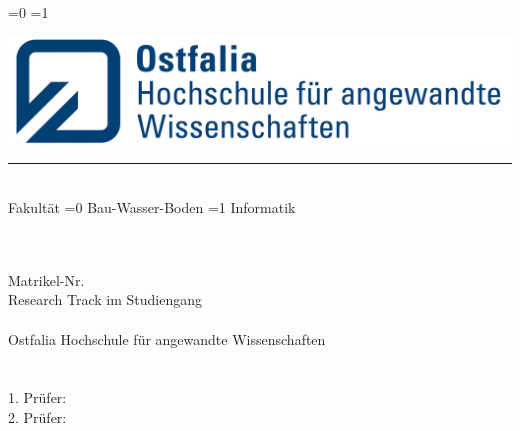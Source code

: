 
\begin{titlepage}
    
    \ifnum\value{documentfakultaet}=0
    \fi\ifnum\value{documentfakultaet}=1
    \fi
    
    \begin{flushleft}
    \includegraphics[scale=0.9]{Bilder/ostfalia_logo2.png}\\
    \color{strich} 
    \hspace{24mm}\rule{70mm}{0.25mm}\\
    \hspace{24mm}\Large
    \textsf{Fakultät
        \ifnum\value{documentfakultaet}=0
	    	Bau-Wasser-Boden
	    \fi\ifnum\value{documentfakultaet}=1
	    	Informatik
	    \fi
	}
    \end{flushleft}
    
    \begin{flushleft}
         \vspace{3em}
        {\color{text}\fontsize{21}{20}{\textsf{\documenttitle}}}\\
        \vspace{6em}
         {\large\textsf{\textbf{\documentname}}}\\
         {\small\textsf{Matrikel-Nr. \documentmanr}}\\
        \vspace{3em}
        {\color{black}\large\textsf{Research Track im Studiengang \documentstudiengang\\
        \documentachievement
        \ \\
        Ostfalia Hochschule für angewandte Wissenschaften\\
        \color{strich}
        \hrulefill\\
        \ \\\color{black}
        1. Prüfer: \documentbetreuer
        \ \\
        2. Prüfer: \documentbetreuerzwei
        \ \\
        \ \\
        }}
        

\end{flushleft}
\end{titlepage}
